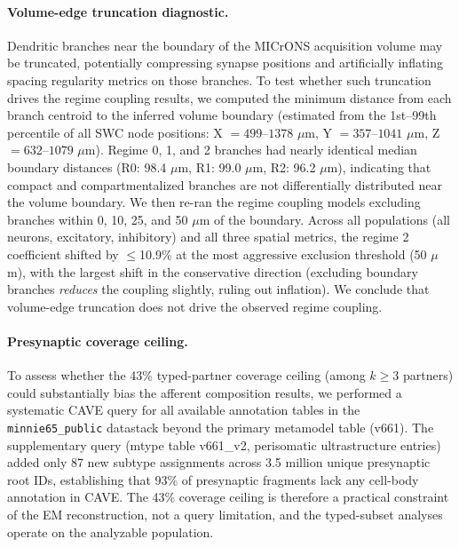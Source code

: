 \documentclass[11pt]{article}
\begin{document}
\paragraph{Volume-edge truncation diagnostic.}
Dendritic branches near the boundary of the MICrONS acquisition volume may be truncated, potentially compressing synapse positions and artificially inflating spacing regularity metrics on those branches. To test whether such truncation drives the regime coupling results, we computed the minimum distance from each branch centroid to the inferred volume boundary (estimated from the 1st--99th percentile of all SWC node positions: X $= 499$--$1378$ $\mu$m, Y $= 357$--$1041$ $\mu$m, Z $= 632$--$1079$ $\mu$m). Regime 0, 1, and 2 branches had nearly identical median boundary distances (R0: 98.4 $\mu$m, R1: 99.0 $\mu$m, R2: 96.2 $\mu$m), indicating that compact and compartmentalized branches are not differentially distributed near the volume boundary. We then re-ran the regime coupling models excluding branches within 0, 10, 25, and 50 $\mu$m of the boundary. Across all populations (all neurons, excitatory, inhibitory) and all three spatial metrics, the regime 2 coefficient shifted by $\leq$10.9\% at the most aggressive exclusion threshold (50 $\mu$m), with the largest shift in the conservative direction (excluding boundary branches \textit{reduces} the coupling slightly, ruling out inflation). We conclude that volume-edge truncation does not drive the observed regime coupling.

\paragraph{Presynaptic coverage ceiling.}
To assess whether the 43\% typed-partner coverage ceiling (among $k \geq 3$ partners) could substantially bias the afferent composition results, we performed a systematic CAVE query for all available annotation tables in the \texttt{minnie65\_public} datastack beyond the primary metamodel table (v661). The supplementary query (mtype table v661\_v2, perisomatic ultrastructure entries) added only 87 new subtype assignments across 3.5 million unique presynaptic root IDs, establishing that 93\% of presynaptic fragments lack any cell-body annotation in CAVE. The 43\% coverage ceiling is therefore a practical constraint of the EM reconstruction, not a query limitation, and the typed-subset analyses operate on the analyzable population.
\end{document}
